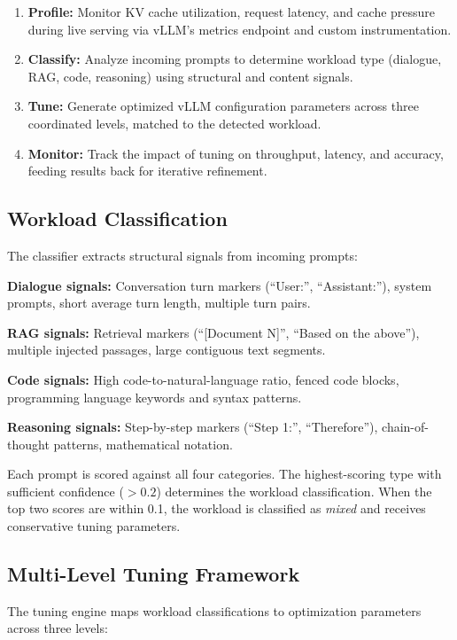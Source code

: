\documentclass[conference]{IEEEtran}
\begin{document}
\begin{enumerate}
\item \textbf{Profile:} Monitor KV cache utilization, request latency, and cache pressure during live serving via vLLM's metrics endpoint and custom instrumentation.
\item \textbf{Classify:} Analyze incoming prompts to determine workload type (dialogue, RAG, code, reasoning) using structural and content signals.
\item \textbf{Tune:} Generate optimized vLLM configuration parameters across three coordinated levels, matched to the detected workload.
\item \textbf{Monitor:} Track the impact of tuning on throughput, latency, and accuracy, feeding results back for iterative refinement.
\end{enumerate}

\subsection{Workload Classification}

The classifier extracts structural signals from incoming prompts:

\textbf{Dialogue signals:} Conversation turn markers (``User:'', ``Assistant:''), system prompts, short average turn length, multiple turn pairs.

\textbf{RAG signals:} Retrieval markers (``[Document N]'', ``Based on the above''), multiple injected passages, large contiguous text segments.

\textbf{Code signals:} High code-to-natural-language ratio, fenced code blocks, programming language keywords and syntax patterns.

\textbf{Reasoning signals:} Step-by-step markers (``Step 1:'', ``Therefore''), chain-of-thought patterns, mathematical notation.

Each prompt is scored against all four categories. The highest-scoring type with sufficient confidence ($>0.2$) determines the workload classification. When the top two scores are within 0.1, the workload is classified as \textit{mixed} and receives conservative tuning parameters.

\subsection{Multi-Level Tuning Framework}

The tuning engine maps workload classifications to optimization parameters across three levels:
\end{document}
